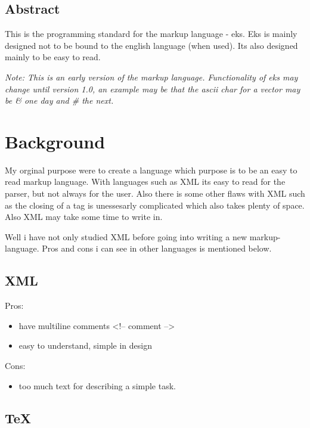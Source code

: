 \documentclass{book}
\begin{document}
	\section*{Abstract}
	
	This is the programming standard for the markup language - eks. 
	Eks is mainly designed not to be bound to the english language (when used). Its also designed mainly to be easy to read.
	
	\emph{Note: This is an early version of the markup language. Functionality of eks may change until version 1.0, an example may be that the ascii char for a vector may be \& one day and \# the next.}
	
	\newpage
	
	\tableofcontents
	\newpage
	
	\chapter{Background}
	
	My orginal purpose were to create a language which purpose is to be an easy to read markup language. 
	With languages such as XML its easy to read for the parser, but not always for the user. 
	Also there is some other flaws with XML such as the closing of a tag is unessesarly complicated which also takes plenty of space.
	Also XML may take some time to write in. 
	
	Well i have not only studied XML before going into writing a new markup-language.
	Pros and cons i can see in other languages is mentioned below.

	\section{XML}
	
	Pros:
	
	\begin{itemize}
		\item have multiline comments <!-- comment -->
		\item easy to understand, simple in design
	\end{itemize}
	
	Cons:
	
	\begin{itemize}
		\item too much text for describing a simple task.
	\end{itemize}
	
	\section{TeX}
	
\end{document}
